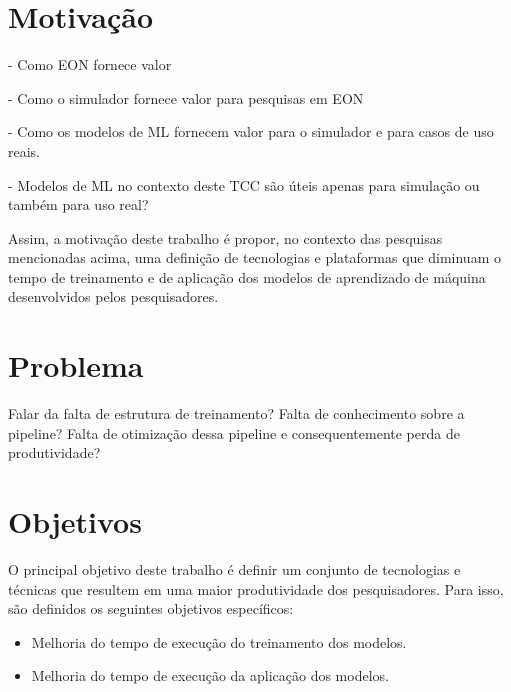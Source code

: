 \section{Motivação}%

- Como EON fornece valor

- Como o simulador fornece valor para pesquisas em EON

- Como os modelos de ML fornecem valor para o simulador e para casos de uso reais.

- Modelos de ML no contexto deste TCC são úteis apenas para simulação ou também para uso real?

Assim, a motivação deste trabalho é propor, no contexto das pesquisas mencionadas acima, uma definição de tecnologias e plataformas que diminuam o tempo de treinamento e de aplicação dos modelos de aprendizado de máquina desenvolvidos pelos pesquisadores.

\section{Problema}%



Falar da falta de estrutura de treinamento? Falta de conhecimento sobre a pipeline?
Falta de otimização dessa pipeline e consequentemente perda de produtividade?

\section{Objetivos}%

O principal objetivo deste trabalho é definir um conjunto de tecnologias e técnicas que resultem em uma maior produtividade dos pesquisadores. Para isso, são definidos os seguintes objetivos específicos:

\begin{itemize}
  \item Melhoria do tempo de execução do treinamento  dos modelos.
  \item Melhoria do tempo de execução da aplicação dos modelos.
\end{itemize}